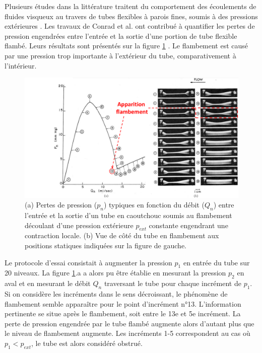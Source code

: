 Plusieurs études dans la littérature traitent du comportement des écoulements de fluides visqueux au travers de tubes flexibles à parois fines, soumis à des pressions extérieures \cite{Elad1992,Ribeau1994,Heil1996}. Les travaux de Conrad et al. ont contribué à quantifier les pertes de pression engendrées entre l'entrée et la sortie d'une portion de tube flexible flambé. Leurs résultats sont présentés sur la figure \ref{fig:écoulement_tube_écrésé_Conrad1969} \cite{Conrad1969}. Le flambement est causé par une pression trop importante à l’extérieur du tube, comparativement à l'intérieur.
\begin{figure}[!htbp]
	\begin{center}
		\captionsetup{justification=centering}
		\includegraphics[trim={4cm 0cm 0cm 0cm},clip, 					                 width=\textwidth]{../Chap2/Figure/écoulement_tube_écrésé_Conrad1969.pdf}
		\caption{(a) Pertes de pression ($p_n$) typiques en fonction du débit ($Q_n$) entre l'entrée et la sortie d'un tube en caoutchouc soumis au flambement découlant d'une pression extérieure $p_{ext}$ constante engendrant une contraction locale. (b) Vue de côté du tube en flambement aux positions statiques indiquées sur la figure de gauche. \cite{Conrad1969}}
		\label{fig:écoulement_tube_écrésé_Conrad1969}
	\end{center}
\end{figure}
Le protocole d'essai consistait à augmenter la pression $p_1$ en entrée du tube sur 20 niveaux. La figure \ref{fig:écoulement_tube_écrésé_Conrad1969}.a a alors pu être établie en mesurant la pression $p_2$ en aval et en mesurant le débit $Q_n$ traversant le tube pour chaque incrément de $p_1$. Si on considère les incréments dans le sens décroissant, le phénomène de flambement semble apparaître pour le point d'incrément n°13. L'information pertinente se situe après le flambement, soit entre le 13e et 5e incrément. La perte de pression engendrée par le tube flambé augmente alors d'autant plus que le niveau de flambement augmente. Les incréments 1-5 correspondent au cas où $p_1<p_{ext}$, le tube est alors considéré obstrué. 
